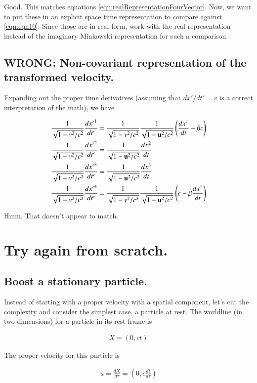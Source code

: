 Good.  This matches equations \ref{eqn:realRepresentationFourVector}.  Now, we want to put these in an explicit space time representation
to compare against \ref{eqn:eqn10}.  Since those are in real form, work with the real representation instead of the imaginary Minkowski
representation for such a comparison.

\subsection{WRONG: Non-covariant representation of the transformed velocity. }

Expanding out the proper time derivatives (assuming that $dx'/dt' = v$ is a correct interpretation of the math), we have

\begin{align*}
\frac{1}{\sqrt{1 - v^2/c^2}} \frac{{dx'}^1}{dt'} &= \frac{1}{\sqrt{1 - v^2/c^2}} \frac{1}{\sqrt{1 - \mathbf{u}^2/c^2}} \left( \frac{dx^1}{dt} - \beta c \right) \\
\frac{1}{\sqrt{1 - v^2/c^2}} \frac{{dx'}^2}{dt'} &= \frac{1}{\sqrt{1 - \mathbf{u}^2/c^2}} \frac{dx^2}{dt} \\
\frac{1}{\sqrt{1 - v^2/c^2}} \frac{{dx'}^3}{dt'} &= \frac{1}{\sqrt{1 - \mathbf{u}^2/c^2}} \frac{dx^3}{dt} \\
\frac{1}{\sqrt{1 - v^2/c^2}} \frac{{dx'}^4}{dt'} &= \frac{1}{\sqrt{1 - v^2/c^2}} \frac{1}{\sqrt{1 - \mathbf{u}^2/c^2}} \left( c - \beta \frac{dx^1}{dt} \right)
\end{align*}

Hmm.  That doesn't appear to match.

\section{Try again from scratch. }

\subsection{Boost a stationary particle. }

Instead of starting with a proper velocity with a spatial component, let's cut the complexity and consider the simplest case, a particle at rest.  The worldline (in two dimensions) for a particle in its rest frame is

\begin{align*}
X = (0, ct) 
\end{align*}

The proper velocity for this particle is 

\begin{align*}
u = \frac{dX}{d\tau} = \left(0, c\frac{dt}{d\tau} \right) 
\end{align*}

